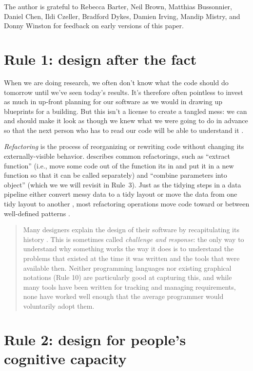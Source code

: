\documentclass[10pt,letterpaper]{article}
\begin{document}
The author is grateful to Rebecca Barter,
Neil Brown,
Matthias Bussonnier,
Daniel Chen,
Ildi Czeller,
Bradford Dykes,
Damien Irving,
Mandip Mistry,
and Donny Winston
for feedback on early versions of this paper.

\section*{Rule 1: design after the fact}

When we are doing research,
we often don't know what the code should do tomorrow
until we've seen today's results.
It's therefore often pointless to invest as much in up-front planning for our software
as we would in drawing up blueprints for a building.
But this isn't a license to create a tangled mess:
we can and should make it look as though we knew what we were going to do in advance
so that the next person who has to read our code will be able to understand it \cite{Parnas1986}.

\emph{Refactoring} is the process of reorganizing or rewriting code
without changing its externally-visible behavior.
\cite{Fowler2018} describes common refactorings,
such as ``extract function''
(i.e., move some code out of the function its in
and put it in a new function so that it can be called separately)
and ``combine parameters into object''
(which we we will revisit in Rule~3).
Just as the tidying steps in a data pipeline
either convert messy data to a tidy layout or move the data from one tidy layout to another \cite{Wickham2017},
most refactoring operations move code toward or between well-defined patterns \cite{Kerievsky2004}.

\begin{quotation}
  \noindent
  Many designers explain the design of their software
  by recapitulating its history \cite{Brown2011,Brown2012}.
  This is sometimes called \emph{challenge and response}:
  the only way to understand why something works the way it does
  is to understand the problems that existed at the time it was written
  and the tools that were available then.
  Neither programming languages nor existing graphical notations (Rule 10)
  are particularly good at capturing this,
  and while many tools have been written for tracking and managing requirements,
  none have worked well enough that the average programmer would voluntarily adopt them.
\end{quotation}

\section*{Rule 2: design for people's cognitive capacity}
\end{document}
